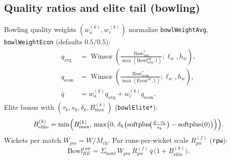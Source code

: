 \documentclass[12pt,a4paper]{article}
\newcommand{\winsor}{\operatorname{Winsor}}
\newcommand{\softplus}{\operatorname{softplus}}
\begin{document}
\subsection{Quality ratios and elite tail (bowling)}
Bowling quality weights $(w_a^{(k)},w_e^{(k)})$ normalize \texttt{bowlWeightAvg}, \texttt{bowlWeightEcon} (defaults $0.5/0.5$):
\begin{align}
  q_{\mathrm{avg}} &= \winsor\!\left(\frac{\mathrm{Base}^\ast_{\mathrm{bwl}}}{\max(\mathrm{Bowl}^{\mathrm{eff}}_{avg},1)};\ell_w,h_w\right), \\
  q_{\mathrm{econ}} &= \winsor\!\left(\frac{\mathrm{Base}^\ast_{\mathrm{econ}}}{\max(\mathrm{Econ}^{\mathrm{eff}},1)};\ell_w,h_w\right), \\
  \bar q &= w_a^{(k)} q_{\mathrm{avg}} + w_e^{(k)} q_{\mathrm{econ}}.
\end{align}
Elite bonus with $(\tau_k,s_k,\delta_k,B_{\max}^{(k)})$ (\texttt{bowlElite*}):
\begin{equation}
  B_{\mathrm{elite}}^{(k)}
  = \min\Bigl(B_{\max}^{(k)},\,\max\bigl(0,\,\delta_k\bigl(\softplus\!\bigl(\tfrac{\bar q-\tau_k}{s_k}\bigr)-\softplus(0)\bigr)\Bigr)\Bigr).
\end{equation}
Wickets per match $W_{pm}=W/M_{\mathrm{ch}}$. Par runs-per-wicket scale $R_{pw}^{(f)}$ (\texttt{rpw}):
\begin{equation}
  \mathrm{Bowl}_{RE}^{\mathrm{raw}}
  = \Sigma_{\mathrm{bowl}}\,W_{pm}\,R_{pw}^{(f)}\,\bar q\,\bigl(1+B_{\mathrm{elite}}^{(k)}\bigr).
\end{equation}
\end{document}
